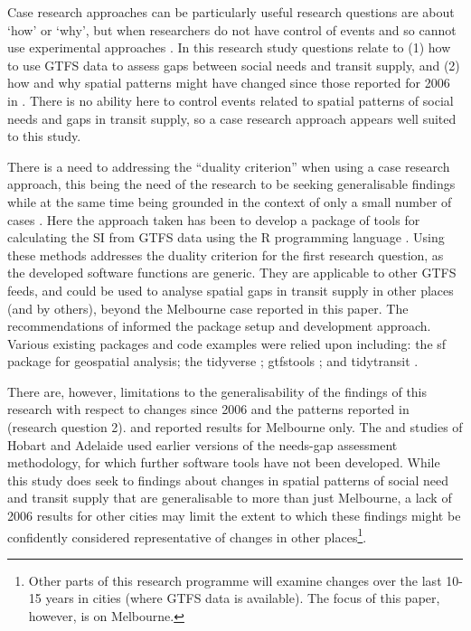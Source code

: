 \documentclass[preprint, 3p,
authoryear]{elsarticle} %
\begin{document}
Case research approaches can be particularly useful research questions
are about `how' or `why', but when researchers do not have control of
events and so cannot use experimental approaches \citep{Yin2009aa}. In
this research study questions relate to (1) how to use GTFS data to
assess gaps between social needs and transit supply, and (2) how and why
spatial patterns might have changed since those reported for 2006 in
\citet{currie2010identifying}. There is no ability here to control
events related to spatial patterns of social needs and gaps in transit
supply, so a case research approach appears well suited to this study.

There is a need to addressing the ``duality criterion'' when using a
case research approach, this being the need of the research to be
seeking generalisable findings while at the same time being grounded in
the context of only a small number of cases
\citep{Denscombe2007aa, Ketokivi2014aa}. Here the approach taken has
been to develop a package of tools for calculating the SI from GTFS data
using the R programming language \citep{R-base}. Using these methods
addresses the duality criterion for the first research question, as the
developed software functions are generic. They are applicable to other
GTFS feeds, and could be used to analyse spatial gaps in transit supply
in other places (and by others), beyond the Melbourne case reported in
this paper. The recommendations of \citet{wickham2023r} informed the
package setup and development approach. Various existing packages and
code examples were relied upon including: the sf package \citep{R-sf}
for geospatial analysis; the tidyverse \citep{tidyverse2019}; gtfstools
\citep{R-gtfstools}; and tidytransit \citep{R-tidytransit}.

There are, however, limitations to the generalisability of the findings
of this research with respect to changes since 2006 and the patterns
reported in \citet{currie2010identifying}(research question 2).
\citet{Currie2007Identifying} and \citet{currie2010identifying} reported
results for Melbourne only. The \citet{Currie2003Hobart} and
\citet{Currie2004Gap} studies of Hobart and Adelaide used earlier
versions of the needs-gap assessment methodology, for which further
software tools have not been developed. While this study does seek to
findings about changes in spatial patterns of social need and transit
supply that are generalisable to more than just Melbourne, a lack of
2006 results for other cities may limit the extent to which these
findings might be confidently considered representative of changes in
other places\footnote{Other parts of this research programme will
  examine changes over the last 10-15 years in cities (where GTFS data
  is available). The focus of this paper, however, is on Melbourne.}.
\end{document}
